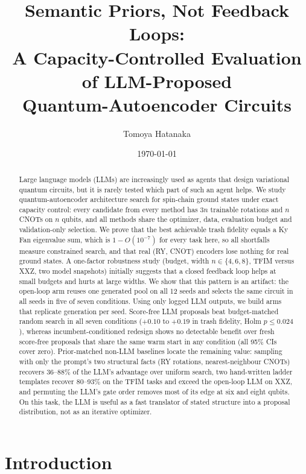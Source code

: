 \documentclass[11pt]{article}
\title{Semantic Priors, Not Feedback Loops:\\
A Capacity-Controlled Evaluation of LLM-Proposed\\ Quantum-Autoencoder Circuits}
\author{Tomoya Hatanaka}
\date{\today}
\begin{document}
\maketitle

\begin{abstract}
Large language models (LLMs) are increasingly used as agents that design variational
quantum circuits, but it is rarely tested which part of such an agent helps.
We study quantum-autoencoder architecture search for spin-chain ground states under
exact capacity control: every candidate from every method has $3n$ trainable rotations
and $n$ CNOTs on $n$ qubits, and all methods share the optimizer, data, evaluation
budget and validation-only selection. We prove that the best achievable trash fidelity
equals a Ky Fan eigenvalue sum, which is $1-O(10^{-7})$ for every task here, so all
shortfalls measure constrained search, and that real (RY, CNOT) encoders lose nothing
for real ground states.
A one-factor robustness study (budget, width $n\in\{4,6,8\}$, TFIM versus XXZ, two
model snapshots) initially suggests that a closed feedback loop helps at small budgets
and hurts at large widths. We show that this pattern is an artifact: the open-loop arm
reuses one generated pool on all 12 seeds and selects the same circuit in all seeds in
five of seven conditions. Using only logged LLM outputs, we build arms that replicate
generation per seed. Score-free LLM proposals beat budget-matched random search in all
seven conditions ($+0.10$ to $+0.19$ in trash fidelity, Holm $p\le0.024$), whereas
incumbent-conditioned redesign shows no detectable benefit over fresh score-free
proposals that share the same warm start in any condition (all 95\% CIs cover zero).
Prior-matched non-LLM baselines locate the remaining value: sampling with only the
prompt's two structural facts (RY rotations, nearest-neighbour CNOTs) recovers
36--88\% of the LLM's advantage over uniform search, two hand-written ladder templates
recover 80--93\% on the TFIM tasks and exceed the open-loop LLM on XXZ, and
permuting the LLM's gate order removes most of its edge at six and eight qubits.
On this task, the LLM is useful as a fast translator of stated structure into a
proposal distribution, not as an iterative optimizer.
\end{abstract}

\section{Introduction}
\end{document}
